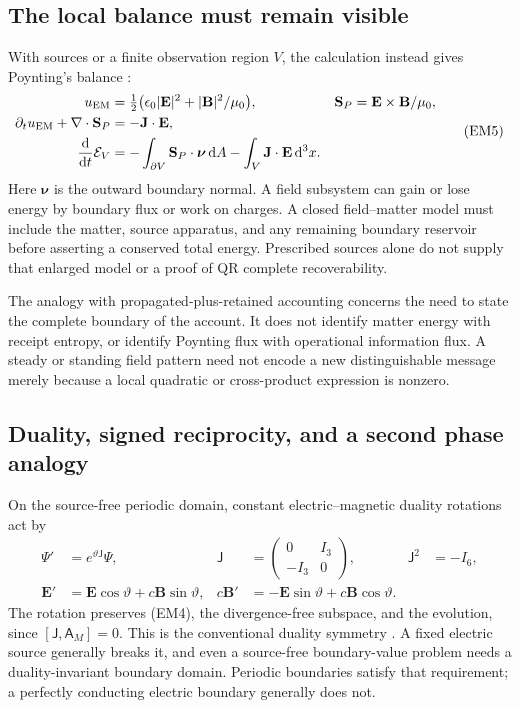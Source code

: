 \subsection{The local balance must remain visible}
With sources or a finite observation region $V$, the calculation instead gives Poynting's balance \citep{feynmanenergy}:
\begin{equation}
\begin{aligned}
u_{\rm EM}&=\tfrac12\bigl(\epsilon_0|\mathbf E|^2+|\mathbf B|^2/\mu_0\bigr),
&\mathbf S_P&=\mathbf E\times\mathbf B/\mu_0,\\
\partial_t u_{\rm EM}+\nabla\cdot\mathbf S_P&=-\mathbf J\cdot\mathbf E,\\
\frac{\mathrm d}{\mathrm dt}\mathcal E_V
&=-\int_{\partial V}\mathbf S_P\cdot\boldsymbol\nu\,\mathrm dA
-\int_V\mathbf J\cdot\mathbf E\,\mathrm d^3x.
\end{aligned}
\tag{EM5}\label{eq:poyntingbalance}
\end{equation}
Here $\boldsymbol\nu$ is the outward boundary normal. A field subsystem can gain or lose energy by boundary flux or work on charges. A closed field--matter model must include the matter, source apparatus, and any remaining boundary reservoir before asserting a conserved total energy. Prescribed sources alone do not supply that enlarged model or a proof of QR complete recoverability.

The analogy with propagated-plus-retained accounting concerns the need to state the complete boundary of the account. It does not identify matter energy with receipt entropy, or identify Poynting flux with operational information flux. A steady or standing field pattern need not encode a new distinguishable message merely because a local quadratic or cross-product expression is nonzero.

\subsection{Duality, signed reciprocity, and a second phase analogy}
On the source-free periodic domain, constant electric--magnetic duality rotations act by
\begin{equation}
\begin{aligned}
\Psi'&=e^{\vartheta\mathsf J}\Psi,
&\mathsf J&=\begin{pmatrix}0&I_3\\-I_3&0\end{pmatrix},
&\mathsf J^2&=-I_6,\\
\mathbf E'&=\mathbf E\cos\vartheta+c\mathbf B\sin\vartheta,
&c\mathbf B'&=-\mathbf E\sin\vartheta+c\mathbf B\cos\vartheta.
\end{aligned}
\tag{EM6}\label{eq:duality}
\end{equation}
The rotation preserves (EM4), the divergence-free subspace, and the evolution, since $[\mathsf J,\mathsf A_M]=0$. This is the conventional duality symmetry \citep{fernandezcorbaton2013}. A fixed electric source generally breaks it, and even a source-free boundary-value problem needs a duality-invariant boundary domain. Periodic boundaries satisfy that requirement; a perfectly conducting electric boundary generally does not.

